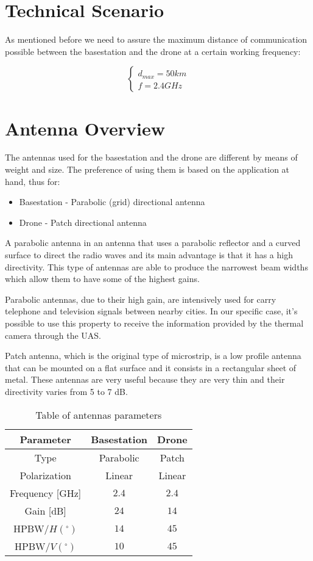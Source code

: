 \section*{Technical Scenario}
As mentioned before we need to assure the maximum distance of communication possible between the basestation and the drone at a certain working frequency:

\begin{equation*}\label{eq:tech_parameters1} 
 	\begin{cases}
 		d_{max} = 50 km	\\
 		f = 2.4 GHz
 	\end{cases}
\end{equation*}

\section*{Antenna Overview}
The antennas used for the basestation and the drone are different by means of weight and size. The preference of using them is based on the application at hand, thus for:
\begin{itemize}
	\item Basestation - Parabolic (grid) directional antenna 
	\item Drone - Patch directional antenna
\end{itemize}

A parabolic antenna in an antenna that uses a parabolic reflector and a curved surface to direct the radio waves and its main advantage is that it has a high directivity. This type of antennas are able to produce the narrowest beam widths which allow them to have some of the highest gains.

Parabolic antennas, due to their high gain, are intensively used for carry telephone and television signals between nearby cities. In our specific case, it’s possible to use this property to receive the information provided by the thermal camera through the UAS.

Patch antenna, which is the original type of microstrip, is a low profile antenna that can be mounted on a flat surface and it consists in a rectangular sheet of metal. These antennas are very useful because they are very thin and their directivity varies from 5 to 7 dB.

\begin{table}[h!]
\centering
	\begin{tabular}{|c||c|c|}
		\hline
		Parameter & Basestation & Drone\\ \hline\hline
		Type & Parabolic & Patch\\ \hline
		Polarization & Linear & Linear\\ \hline
		Frequency [GHz] & $2.4$ & $2.4$\\ \hline
		Gain [dB] & $24$ & $14$\\ \hline
		HPBW/$H(^{\circ})$ & $14$ & $45$\\ \hline
		HPBW/$V(^{\circ})$ & $10$ & $45$\\ \hline
	\end{tabular}
	\caption{Table of antennas parameters}
	\label{table:1}
\end{table}

